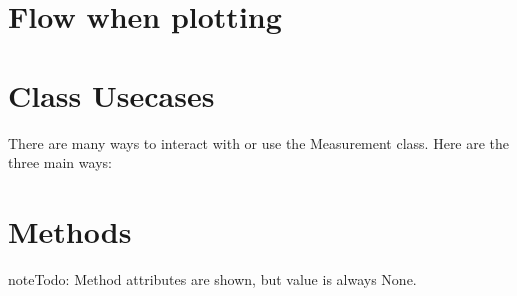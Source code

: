 \documentclass[letterpaper,10pt,english]{sphinxmanual}
\begin{document}
\section{Flow when plotting}
\label{\detokenize{measurement:flow-when-plotting}}

\section{Class Usecases}
\label{\detokenize{measurement:class-usecases}}
There are many ways to interact with or use the Measurement class. Here are the three main ways:


\section{Methods}
\label{\detokenize{measurement:methods}}
\begin{sphinxadmonition}{note}{\label{measurement:index-0}Todo:}
Method attributes are shown, but value is always None.
\end{sphinxadmonition}
\label{\detokenize{measurement:module-measurement}}
\end{document}
